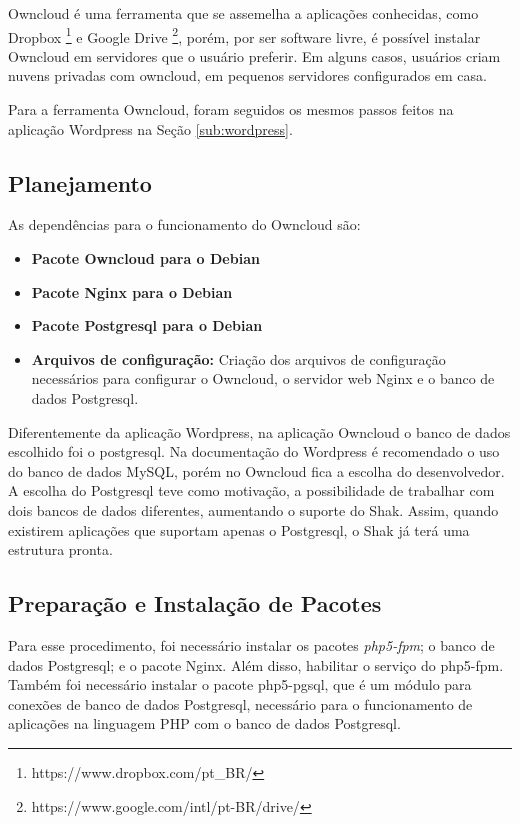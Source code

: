 Owncloud é uma ferramenta que se assemelha a aplicações conhecidas, como Dropbox
\footnote{https://www.dropbox.com/pt\_BR/} e Google Drive \footnote{https://www.google.com/intl/pt-BR/drive/}, porém, por ser software livre, é possível instalar Owncloud em servidores
que o usuário preferir. Em alguns casos, usuários criam nuvens privadas com 
owncloud, em pequenos servidores configurados em casa.

Para a ferramenta Owncloud, foram seguidos os mesmos passos feitos na aplicação
Wordpress na Seção \ref{sub:wordpress}.

\subsection{Planejamento}

As dependências para o funcionamento do Owncloud são:

\begin{itemize}
   \item \textbf{Pacote Owncloud para o Debian}
   \item \textbf{Pacote Nginx para o Debian}
   \item \textbf{Pacote Postgresql para o Debian}
   \item \textbf{Arquivos de configuração:} Criação dos arquivos de configuração
   necessários para configurar o Owncloud, o servidor web Nginx e o banco de dados
   Postgresql.
\end{itemize}

Diferentemente da aplicação Wordpress, na aplicação Owncloud o 
banco de dados escolhido foi o postgresql. Na documentação do Wordpress é recomendado
o uso do banco de dados MySQL, porém no Owncloud fica a escolha do desenvolvedor.
A escolha do Postgresql teve como motivação, a possibilidade de trabalhar com dois bancos de
dados diferentes, aumentando o suporte do Shak. Assim, quando existirem aplicações
que suportam apenas o Postgresql, o Shak já terá uma estrutura pronta.

\subsection{Preparação e Instalação de Pacotes}

Para esse procedimento, foi necessário instalar os pacotes \textit{php5-fpm}; o banco
de dados Postgresql; e o pacote Nginx. Além disso, habilitar o serviço do php5-fpm. 
Também foi necessário instalar o pacote php5-pgsql, que é um módulo para
conexões de banco de dados Postgresql, necessário para o funcionamento de
aplicações na linguagem PHP com o banco de dados Postgresql.

